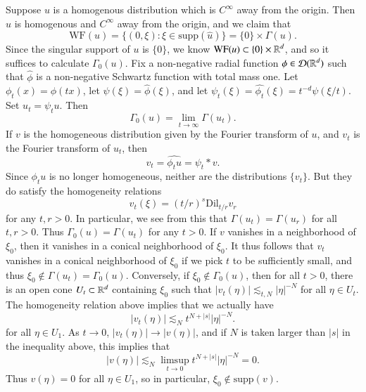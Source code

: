 \begin{example}
  Suppose $u$ is a homogenous distribution which is $C^\infty$ away from the origin. Then $\widehat{u}$ is homogenous and $C^\infty$ away from the origin, and we claim that
  \[ \text{WF}(u) = \{ (0,\xi): \xi \in \text{supp}(\widehat{u}) \} = \{ 0 \} \times \Gamma(u). \]
  Since the singular support of $u$ is $\{ 0 \}$, we know $\text{WF}(u) \subset \{ 0 \} \times \operatorname{\mathbb{R}}^d$, and so it suffices to calculate $\Gamma_0(u)$. Fix a non-negative radial function $\phi \in \operatorname{\mathcal{D}}(\operatorname{\mathbb{R}}^d)$ such that $\widehat{\phi}$ is a non-negative Schwartz function with total mass one. Let $\phi_t(x) = \phi(tx)$, let $\psi(\xi) = \widehat{\phi}(\xi)$, and let $\psi_t(\xi) = \widehat{\phi_t}(\xi) = t^{-d} \psi(\xi/t)$. Set $u_t = \psi_t u$. Then
  \[ \Gamma_0(u) = \lim_{t \to \infty} \Gamma(u_t). \]
  If $v$ is the homogeneous distribution given by the Fourier transform of $u$, and $v_t$ is the Fourier transform of $u_t$, then
  \[ v_t = \widehat{\phi_t u} = \psi_t * v. \]
  Since $\phi_t u$ is no longer homogeneous, neither are the distributions $\{ v_t \}$. But they do satisfy the homogeneity relations
  \[ v_t(\xi) = (t/r)^s \text{Dil}_{t/r} v_r \]
  for any $t,r > 0$. In particular, we see from this that $\Gamma(u_t) = \Gamma(u_r)$ for all $t,r > 0$. Thus $\Gamma_0(u) = \Gamma(u_t)$ for any $t > 0$. If $v$ vanishes in a neighborhood of $\xi_0$, then it vanishes in a conical neighborhood of $\xi_0$. It thus follows that $v_t$ vanishes in a conical neighborhood of $\xi_0$ if we pick $t$ to be sufficiently small, and thus $\xi_0 \not \in \Gamma(u_t) = \Gamma_0(u)$. Conversely, if $\xi_0 \not \in \Gamma_0(u)$, then for all $t > 0$, there is an open cone $U_t \subset \operatorname{\mathbb{R}}^d$ containing $\xi_0$ such that $|v_t(\eta)| \lesssim_{t,N} |\eta|^{-N}$ for all $\eta \in U_t$. The homogeneity relation above implies that we actually have
  \[ |v_t(\eta)| \lesssim_N t^{N + |s|} |\eta|^{-N}. \]
  for all $\eta \in U_1$. As $t \to 0$, $|v_t(\eta)| \to |v(\eta)|$, and if $N$ is taken larger than $|s|$ in the inequality above, this implies that
  \[ |v(\eta)| \lesssim_N \limsup_{t \to 0} t^{N + |s|} |\eta|^{-N} = 0. \]
  Thus $v(\eta) = 0$ for all $\eta \in U_1$, so in particular, $\xi_0 \not \in \text{supp}(v)$.
\end{example}


